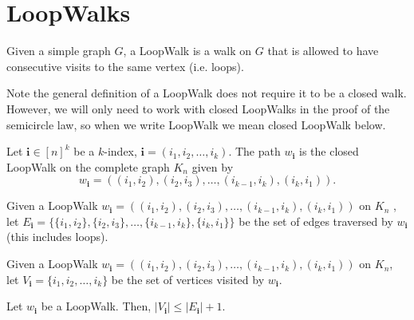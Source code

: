 \chapter{LoopWalks}


\begin{definition}
  \label{def:loop_walk}
  \leanok
  Given a simple graph $G$, a LoopWalk is a walk on $G$ that is allowed to have consecutive visits
  to the same vertex (i.e. loops).
\end{definition}


Note the general definition of a LoopWalk does not require it to be a closed walk. However, we will
only need to work with closed LoopWalks in the proof of the semicircle law, so when we write
LoopWalk we mean closed LoopWalk below.


\begin{definition}
  \label{def:graph_walk_multi_index}
  Let $\mathbf{i} \in[n]^k$ be a $k$-index, $\mathbf{i}=\left(i_1, i_2, \ldots, i_k\right)$. The path
  $w_{\mathbf{i}}$ is the closed LoopWalk on the complete graph $K_n$ given by
  $$
  w_\mathbf{i}=((i_1, i_2),(i_2, i_3), \ldots,(i_{k-1}, i_k),(i_k, i_1)).
  $$
\end{definition}


\begin{definition}
  \label{def:graph_walk_edges}
  Given a LoopWalk $w_\mathbf{i}=((i_1, i_2),(i_2, i_3), \ldots,(i_{k-1}, i_k),(i_k, i_1))$ on
  $K_n$ , let
  $E_\mathbf{i}= \{\{i_1, i_2\},\{i_2, i_3\}, \ldots,\{i_{k-1}, i_k\}, \{i_k, i_1\}\}$ be the set
  of edges traversed by $w_{\mathbf{i}}$ (this includes loops).
\end{definition}


\begin{definition}
  \label{def:graph_walk_vertices}
  Given a LoopWalk $w_\mathbf{i}=((i_1, i_2),(i_2, i_3), \ldots,(i_{k-1}, i_k),(i_k, i_1))$ on
  $K_n$, let $V_\mathbf{i}= \{i_1, i_2, \dots, i_k\}$ be the set
  of vertices visited by $w_{\mathbf{i}}$.
\end{definition}



\begin{proposition}%
  \label{prop:vertex_edge_inequality}
  Let $w_{\mathbf{i}}$ be a LoopWalk. Then,
  $|V_{\mathbf{i}}|\le |E_{\mathbf{i}}|+1$.
\end{proposition}

